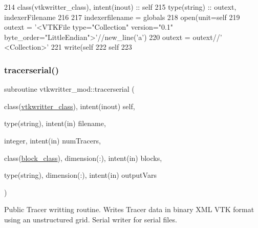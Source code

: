 \begin{DoxyCode}
214     \textcolor{keywordtype}{class}(vtkwritter\_class), \textcolor{keywordtype}{intent(inout)} :: self
215     \textcolor{keywordtype}{type}(string) :: outext, indexerFilename
216 
217     indexerfilename = globals%
218     \textcolor{keyword}{open}(unit=self%
219     outext = \textcolor{stringliteral}{'<VTKFile type="Collection" version="0.1" byte\_order="LittleEndian">'}//new\_line(\textcolor{stringliteral}{'a'})
220     outext = outext//\textcolor{stringliteral}{'  <Collection>'}
221     \textcolor{keyword}{write}(self%
222     self%
223 
\end{DoxyCode}
\mbox{\label{namespacevtkwritter__mod_abe9e092f90713f5e00585f915fe86c2c}} 
\subsubsection{\texorpdfstring{tracerserial()}{tracerserial()}}
{\footnotesize\ttfamily subroutine vtkwritter\+\_\+mod\+::tracerserial (\begin{DoxyParamCaption}\item[{class(\mbox{\hyperlink{structvtkwritter__mod_1_1vtkwritter__class}{vtkwritter\+\_\+class}}), intent(inout)}]{self,  }\item[{type(string), intent(in)}]{filename,  }\item[{integer, intent(in)}]{num\+Tracers,  }\item[{class(\mbox{\hyperlink{structblocks__mod_1_1block__class}{block\+\_\+class}}), dimension(\+:), intent(in)}]{blocks,  }\item[{type(string), dimension(\+:), intent(in)}]{output\+Vars }\end{DoxyParamCaption})\hspace{0.3cm}{\ttfamily [private]}}



Public Tracer writting routine. Writes Tracer data in binary X\+ML V\+TK format using an unstructured grid. Serial writer for serial files. 

